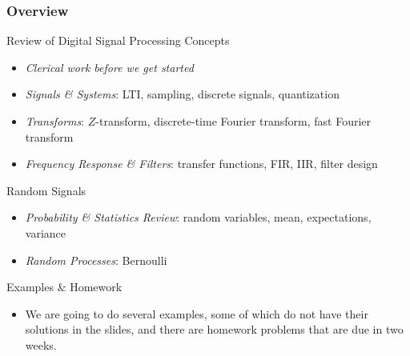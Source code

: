 \documentclass[mathserif,9pt]{beamer}
\begin{document}
\begin{frame}\frametitle{Overview}\small
  \begin{block}{Review of Digital Signal Processing Concepts}
  \begin{itemize}
    \item {\em Clerical work before we get started}
    \item {\em Signals \& Systems}: LTI, sampling, discrete signals, quantization
    \item {\em Transforms}: $Z$-transform, discrete-time Fourier transform, fast Fourier transform 
    \item {\em Frequency Response \& Filters}: transfer functions, FIR, IIR, filter design 
  \end{itemize}
  \end{block}
  
  \begin{exampleblock}{Random Signals}
  \begin{itemize}
    \item {\em Probability \& Statistics Review}: random variables, mean, expectations, variance 
    \item {\em Random Processes}: Bernoulli
  \end{itemize}
  \end{exampleblock}
  
  \begin{alertblock}{Examples \& Homework}
  \begin{itemize}
    \item We are going to do several examples, some of which do not have their solutions in the slides, and there are homework problems that are due in two weeks. 
  \end{itemize}
  \end{alertblock}


\end{frame}
\end{document}

